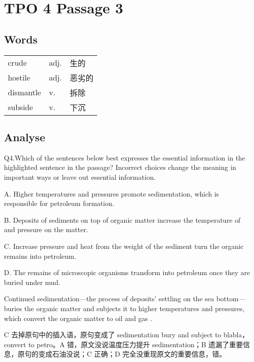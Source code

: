 \section{TPO 4 Passage 3}

\subsection{Words}

\begin{tabular}{lll}
    crude     & adj. & 生的  \\
    hostile   & adj. & 恶劣的 \\
    dismantle & v.   & 拆除  \\
    subside   & v.   & 下沉  \\
\end{tabular}

\subsection{Analyse}

\begin{blk}
    \begin{qst}
        Q4.Which of the sentences below best expresses the essential information in the highlighted sentence in the passage? Incorrect choices change the meaning in important ways or leave out essential information.
    \end{qst}

    \begin{chc}
        A. Higher temperatures and pressures promote sedimentation, which is responsible for petroleum formation.

        B. Deposits of sediments on top of organic matter increase the temperature of and pressure on the matter.

        C. Increase pressure and heat from the weight of the sediment turn the organic remains into petroleum.

        D. The remains of microscopic organisms transform into petroleum once they are buried under mud.
    \end{chc}

    \begin{psgq}
        Continued sedimentation—the process of deposits’ settling on the sea bottom—buries the organic matter and subjects it to higher temperatures and pressures, which convert the organic matter to oil and gas .
    \end{psgq}

    \begin{nlz}
        C 去掉原句中的插入语，原句变成了 sedimentation bury and subject to blabla，convert to petro。A 错，原文没说温度压力提升 sedimentation；B 遗漏了重要信息，原句的变成石油没说；C 正确；D 完全没重现原文的重要信息，错。
    \end{nlz}
\end{blk}

